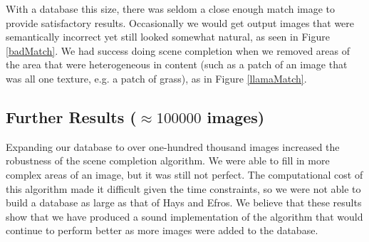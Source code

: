 \documentclass[11pt]{amsart}
\begin{document}
With a database this size, there was seldom a close enough match image to provide satisfactory results. Occasionally we would get output images that were semantically incorrect yet still looked somewhat natural, as seen in Figure \ref{badMatch}. We had success doing scene completion when we removed areas of the area that were heterogeneous in content (such as a patch of an image that was all one texture, e.g. a patch of grass), as in Figure \ref{llamaMatch}.

\subsection{Further Results ($\approx100000$ images)} 

Expanding our database to over one-hundred thousand images increased the robustness of 
the scene completion algorithm. We were able to fill in more complex areas of an image, but
it was still not perfect. The computational cost of this algorithm made it difficult given the time constraints, so we were not able to build a database as large as that of Hays and Efros. We believe 
that these results show that we have produced a sound implementation of the algorithm that would
continue to perform better as more images were added to the database.
\end{document}

